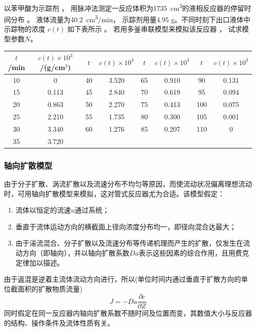 \documentclass[dvipsnames, svgnames, x11names]{beamer}
\begin{document}
\begin{frame}[t]
    \frametitle{}
    \begin{example}
        以苯甲酸为示踪剂 ， 用脉冲法测定一反应体积为\SI{1735}{cm^3}的液相反应器的停留时间分布 。 液体流量为\SI{40.2}{cm^3/min}， 示踪剂用量4.95 g。不同时刻下出口液体中示踪物的浓度 $c(t)$ 如下表所示 。 若用多釜串联模型来模拟该反应器 ， 试求模型参数$N$。
        \begin{table}
            \centering
            \begin{tabular}{cc|cc|cc|cc}
                \bottomrule
                $t$/min & $c(t)\times 10^3$/(g/cm$^3$) & $t$ & $c(t)\times 10^3$ & $t$ & $c(t)\times 10^3$ & $t$ & $c(t)\times 10^3$   \\ \hline
                10 & 0     & 40 & 3.520 & 65 & 0.910 & 90 & 0.131  \\ 
                15 & 0.113 & 45 & 2.840 & 70 & 0.619 & 95 & 0.094  \\ 
                20 & 0.863 & 50 & 2.270 & 75 & 0.413 & 100 & 0.075  \\ 
                25 & 2.210 & 55 & 1.735 & 80 & 0.300 & 105 & 0.001  \\ 
                30 & 3.340 & 60 & 1.276 & 85 & 0.207 & 110 & 0  \\ 
                35 & 3.720 &  &  &  &  &  &  \\ \toprule
            \end{tabular}
        \end{table}
        \vspace{-5pt}
    \end{example}
\end{frame}


\begin{frame}
    \frametitle{轴向扩散模型}

    由于分子扩散、涡流扩散以及流速分布不均匀等原因，而使流动状况偏离理想流动时，可用轴向扩散模型来模拟，这对管式反应器尤为合适。该模型假定：
    \begin{enumerate}
        \item 流体以恒定的流速$u$通过系统；
        \item 垂直于流体运动方向的横截面上径向浓度分布均一，即径向混合达最大；
        \item 由于湍流混合、分子扩散以及流速分布等传递机理而产生的扩散，仅发生在流动方向（即轴向），并以轴向扩散系数$Da$表示这些因素的综合作用，且用费克定律加以描述。
    \end{enumerate}
    由于返混是逆着主流体流动方向进行，所以(单位时间内通过垂直于扩散方向的单位截面积的扩散物质流量)
    \[
        J = - Da \frac{\partial c}{\partial Z}
    \]
    同时假定在同一反应器内轴向扩散系数不随时间及位置而变，其数值大小与反应器的结构、操作条件及流体性质有关。

\end{frame}
\end{document}
